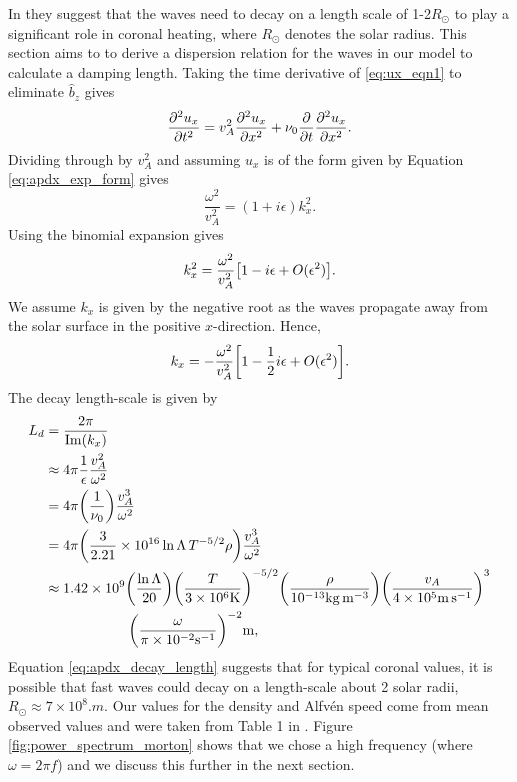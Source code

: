 In \citet{Withbroe1977,Parker1991} they suggest that the waves need to decay on a length scale of 1-2$R_\odot$ to play a significant role in coronal heating, where $R_\odot$ denotes the solar radius. This section aims to to derive a dispersion relation for the waves in our model to calculate a damping length. Taking the time derivative of \eqref{eq:ux_eqn1} to eliminate $\hat{b}_z$ gives
\begin{equation}
    \pdv[2]{u_x}{t} = v_A^2\pdv[2]{u_x}{x} + \nu_0\pdv{}{t}\pdv[2]{u_x}{x}.
\end{equation}
Dividing through by $v_A^2$ and assuming $u_x$ is of the form given by Equation \eqref{eq:apdx_exp_form} gives
\begin{equation}
    \frac{\omega^2}{v_A^2} = (1+i\epsilon)k_x^2.
\end{equation}
Using the binomial expansion gives
\begin{equation}
    k_x^2 = \frac{\omega^2}{v_A^2}\qty[1 -i\epsilon + O(\epsilon^2)].
\end{equation}
We assume $k_x$ is given by the negative root as the waves propagate away from the solar surface in the positive $x$-direction. Hence,
\begin{equation}
    k_x = -\frac{\omega^2}{v_A^2}\qty[1 -\frac{1}{2}i\epsilon + O(\epsilon^2)].
\end{equation}
The decay length-scale is given by
\begin{equation}
    \label{eq:apdx_decay_length}
    \begin{aligned}
    L_d &= \frac{2\pi}{\Im(k_x)} \\
    &\approx4\pi\frac{1}{\epsilon}\frac{v_A^2}{\omega^2} \\
    &= 4\pi\qty(\frac{1}{\nu_0})\frac{v_A^3}{\omega^2} \\
    &= 4\pi\qty(\frac{3}{2.21}\times10^{16}\ln\Lambda\, T^{-5/2}\rho)\frac{v_A^3}{\omega^2}\\
    &\approx 1.42\times10^9\qty(\frac{\ln \Lambda}{20})\qty(\frac{T}{3\times10^6\si{.K}})^{-5/2}\qty(\frac{\rho}{10^{-13}\si{.kg.m^{-3}}})\qty(\frac{v_A}{4\times10^5\si{.m.s^{-1}}})^3 \\
    &\qquad\qquad\qquad\qty(\frac{\omega}{\pi\times10^{-2}\si{.s^{-1}}})^{-2}\si{.m},
    \end{aligned}
\end{equation}
Equation \eqref{eq:apdx_decay_length} suggests that for typical coronal values, it is possible that fast waves could decay on a length-scale about 2 solar radii, $R_\odot\approx 7\times10^8\si{.m}$. Our values for the density and Alfv\'en speed come from mean observed values and were taken from Table 1 in \citet{Morton2016}. Figure \ref{fig:power_spectrum_morton} shows that we chose a high frequency (where $\omega= 2\pi f$) and we discuss this further in the next section.

